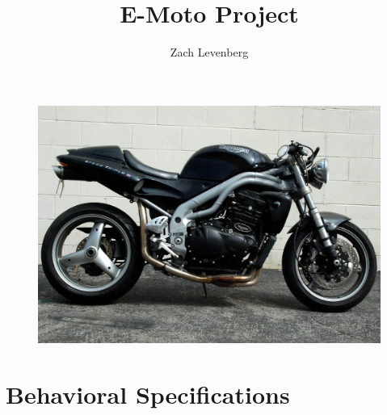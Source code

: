 \documentclass[12pt compsoc]{article}
\begin{document}
\title{E-Moto Project}

\author{Zach Levenberg}

\maketitle


\begin{figure}[b!]
\centering
\includegraphics[width=6in]{triumph-speed-triple.jpg}
\end{figure}





\newpage

\tableofcontents
\newpage


\section{Behavioral Specifications}
\end{document}
